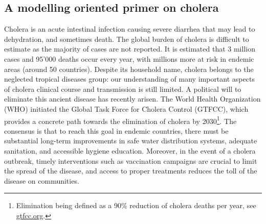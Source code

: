 \begin{fullwidth}
\chapter{A modelling oriented primer on cholera}
\end{fullwidth}
Cholera is an acute intestinal infection causing severe diarrhea that may lead to dehydration, and sometimes death. The global burden of cholera is difficult to estimate as the majority of cases are not reported. It is estimated that 3 million cases and 95'000 deaths occur every year, with millions more at risk in endemic areas (around 50 countries)\cite[-1\baselineskip]{Ali:UpdatedGlobalBurden:2015}. Despite its household name, cholera belongs to the neglected tropical diseases group: our understanding of many important aspects of cholera clinical course and transmission is still limited.
A political will to eliminate this ancient disease has recently arisen. The World Health Organization (WHO) initiated the Global Task Force for Cholera Control (GTFCC), which provides a concrete path towards the elimination of cholera by 2030\footnote[][-3\baselineskip]{Elimination being defined as a 90\% reduction of cholera deaths per year, see \url{gtfcc.org}.}. The consensus is that to reach this goal in endemic countries, there must be substantial long-term improvements in safe water distribution systems, adequate sanitation, and accessible hygiene education. Moreover, in the event of a cholera outbreak, timely interventions such as vaccination campaigns are crucial to limit the spread of the disease, and access to proper treatments reduces the toll of the disease on communities. %


\vspace{.7cm}
